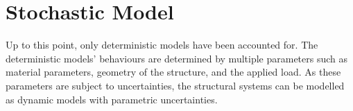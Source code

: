 \documentclass[../main.tex]{subfiles}
\begin{document}
 

\section{Stochastic Model}

Up to this point, only deterministic models have been accounted for. 
The deterministic models' behaviours are determined by multiple parameters such as material parameters, geometry of the structure, and the applied load. 
As these parameters are subject to uncertainties, the structural systems can be modelled as dynamic models with parametric uncertainties. 

 
\end{document}
